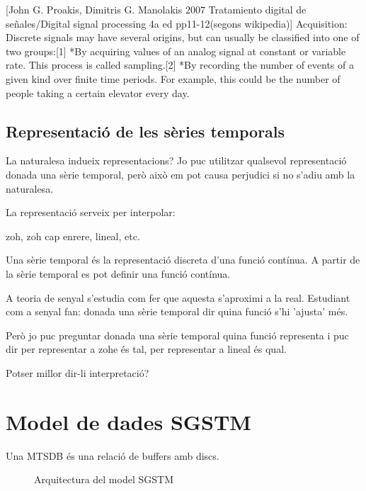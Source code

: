 [John G. Proakis, Dimitris G. Manolakis 2007 Tratamiento digital de señales/Digital signal processing 4a ed pp11-12(segons wikipedia)] Acquisition: Discrete signals may have several origins, but can usually be classified into one of two groups:[1]
*By acquiring values of an analog signal at constant or variable rate. This process is called sampling.[2]
*By recording the number of events of a given kind over finite time periods. For example, this could be the number of people taking a certain elevator every day.




\subsection{Representació de les sèries temporals}



La naturalesa indueix representacions?
Jo puc utilitzar qualsevol representació donada una sèrie temporal, però això em pot causa perjudici si no s'adiu amb la naturalesa.


La representació serveix per interpolar:

zoh, zoh cap enrere, lineal, etc.


Una sèrie temporal és la representació discreta d'una funció contínua. A partir de la sèrie temporal es pot definir una funció contínua. 

A teoria de senyal s'estudia com fer que aquesta s'aproximi a la real. Estudiant com a senyal fan: donada una sèrie temporal dir quina funció s'hi 'ajusta' més. 

Però jo puc preguntar donada una sèrie temporal quina funció representa i puc dir per representar a zohe és tal, per representar a lineal és qual. 

Potser millor dir-li interpretació?






\section{Model de dades SGSTM}

Una MTSDB és una relació de buffers amb discs. 


\begin{figure}[tp]
\centering

\caption{Arquitectura del model SGSTM}
\label{fig:model:bdstm}
\end{figure}


